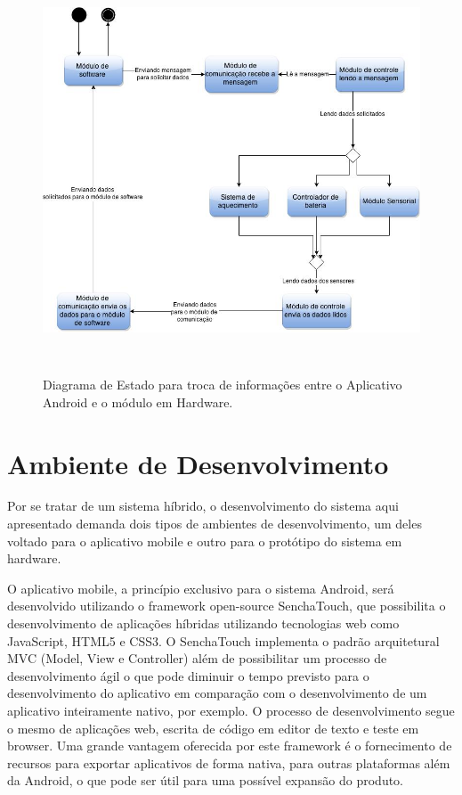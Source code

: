 \documentclass{report}
\begin{document}
   \begin{figure}[H]
	 \includegraphics[width=\linewidth, height = 12cm]{pictures/troca_dados_estado.jpg}
	 \caption{Diagrama de Estado para troca de informações entre o Aplicativo Android e o módulo em Hardware.}
	 \label{figure:troca_info}
	\end{figure}

  
  \section{Ambiente de Desenvolvimento}
  
    Por se tratar de um sistema híbrido, o desenvolvimento do sistema aqui apresentado demanda dois tipos de ambientes de 
    desenvolvimento, um deles voltado para o aplicativo mobile e outro para o protótipo do sistema em hardware.
  
    O aplicativo mobile, a princípio exclusivo para o sistema Android, será desenvolvido utilizando o framework open-source SenchaTouch,
    que possibilita o desenvolvimento de aplicações híbridas utilizando tecnologias web como JavaScript, HTML5 e CSS3. O SenchaTouch implementa 
    o padrão arquitetural MVC (Model, View e Controller) além de possibilitar um processo de desenvolvimento ágil o que pode diminuir o tempo previsto
    para o desenvolvimento do aplicativo em comparação com o desenvolvimento de um aplicativo inteiramente nativo, por exemplo. O processo de
    desenvolvimento segue o mesmo de aplicações web, escrita de código em editor de texto e teste em browser. Uma grande vantagem oferecida
    por este framework é o fornecimento de recursos para exportar aplicativos de forma nativa, para outras plataformas além da Android, o que pode ser 
    útil para uma possível expansão do produto.
\end{document}
